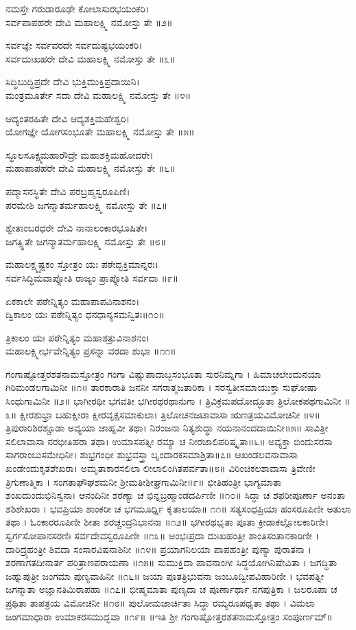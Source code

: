	ನಮಸ್ತೇ ಗರುಡಾರೂಢೇ ಕೋಲಾಸುರಭಯಂಕರಿ।\\
	ಸರ್ವಪಾಪಹರೇ ದೇವಿ ಮಹಾಲಕ್ಷ್ಮಿ ನಮೋಸ್ತು ತೇ ॥೨॥

ಸರ್ವಜ್ಞೇ ಸರ್ವವರದೇ ಸರ್ವದುಷ್ಟಭಯಂಕರಿ।\\
ಸರ್ವದುಃಖಹರೇ ದೇವಿ ಮಹಾಲಕ್ಷ್ಮಿ ನಮೋಸ್ತು ತೇ ॥೩॥

	ಸಿದ್ಧಿಬುದ್ಧಿಪ್ರದೇ ದೇವಿ ಭುಕ್ತಿಮುಕ್ತಿಪ್ರದಾಯಿನಿ।\\
	ಮಂತ್ರಮೂರ್ತೇ ಸದಾ ದೇವಿ ಮಹಾಲಕ್ಷ್ಮಿ ನಮೋಸ್ತು ತೇ ॥೪॥

ಆದ್ಯಂತರಹಿತೇ ದೇವಿ ಆದ್ಯಶಕ್ತಿಮಹೇಶ್ವರಿ।\\
ಯೋಗಜ್ಞೇ ಯೋಗಸಂಭೂತೇ ಮಹಾಲಕ್ಷ್ಮಿ ನಮೋಸ್ತು ತೇ ॥೫॥

	ಸ್ಥೂಲಸೂಕ್ಷ್ಮಮಹಾರೌದ್ರೇ ಮಹಾಶಕ್ತಿಮಹೋದರೇ।\\
	ಮಹಾಪಾಪಹರೇ ದೇವಿ ಮಹಾಲಕ್ಷ್ಮಿ ನಮೋಸ್ತು ತೇ ॥೬॥

ಪದ್ಮಾಸನಸ್ಥಿತೇ ದೇವಿ ಪರಬ್ರಹ್ಮಸ್ವರೂಪಿಣಿ।\\
ಪರಮೇಶಿ ಜಗನ್ಮಾತರ್ಮಹಾಲಕ್ಷ್ಮಿ ನಮೋಸ್ತು ತೇ ॥೭॥

	ಶ್ವೇತಾಂಬರಧರೇ ದೇವಿ ನಾನಾಲಂಕಾರಭೂಷಿತೇ।\\
	ಜಗತ್ಸ್ಥಿತೇ ಜಗನ್ಮಾತರ್ಮಹಾಲಕ್ಷ್ಮಿ ನಮೋಸ್ತು ತೇ ॥೮॥

ಮಹಾಲಕ್ಷ್ಮ್ಯಷ್ಟಕಂ ಸ್ತೋತ್ರಂ ಯಃ ಪಠೇದ್ಭಕ್ತಿಮಾನ್ನರಃ।\\
ಸರ್ವಸಿದ್ಧಿಮವಾಪ್ನೋತಿ ರಾಜ್ಯಂ ಪ್ರಾಪ್ನೋತಿ ಸರ್ವದಾ ॥೯॥

	ಏಕಕಾಲೇ ಪಠೇನ್ನಿತ್ಯಂ ಮಹಾಪಾಪವಿನಾಶನಂ।\\
	ದ್ವಿಕಾಲಂ ಯಃ ಪಠೇನ್ನಿತ್ಯಂ ಧನಧಾನ್ಯಸಮನ್ವಿತಃ॥೧೦॥

ತ್ರಿಕಾಲಂ ಯಃ ಪಠೇನ್ನಿತ್ಯಂ ಮಹಾಶತ್ರುವಿನಾಶನಂ।\\
ಮಹಾಲಕ್ಷ್ಮೀರ್ಭವೇನ್ನಿತ್ಯಂ ಪ್ರಸನ್ನಾ ವರದಾ ಶುಭಾ ॥೧೧॥


ಗಂಗಾಷ್ಟೋತ್ತರಶತನಾಮಸ್ತೋತ್ರಂ
ಗಂಗಾ ವಿಷ್ಣುಪಾದಾಬ್ಜಸಂಭೂತಾ ಸುರನಿಮ್ನಗಾ ।
ಹಿಮಾಚಲೇಂದುನಯಾ ಗಿರಿಮಂಡಲಗಾಮಿನೀ ॥೧॥
	ತಾರಕಾರಾತಿ ಜನನೀ ಸಗರಾತ್ಮಜತಾರಿಕಾ ।
	ಸರಸ್ವತೀಸಮಾಯುಕ್ತಾ ಸುಘೋಷಾ ಸಿಂಧುಗಾಮಿನೀ ॥೨॥
ಭಾಗೀರಥೀ ಭಗವತೀ ಭಗೀರಥರಥಾನುಗಾ ।
ತ್ರಿವಿಕ್ರಮಪದೋದ್ಭೂತಾ ತ್ರಿಲೋಕಪಥಗಾಮಿನೀ ॥೩॥
	ಕ್ಷೀರಶುಭ್ರಾ ಬಹುಕ್ಷೀರಾ ಕ್ಷೀರವೃಕ್ಷಸಮಾಕುಲಾ।
	ತ್ರಿಲೋಚನಜಟಾವಾಸಾ ಋಣತ್ರಯವಿಮೋಚಿನೀ ॥೪॥
ತ್ರಿಪುರಾರಿಶಿರಶ್ಚೂಡಾ ಅವ್ಯಯಾ ಜಾಹ್ನವೀ ತಥಾ।
ನಿರಂಜನಾ ನಿತ್ಯಶುದ್ಧಾ ನಯನಾನಂದದಾಯಿನೀ॥೫॥
	ಸಾವಿತ್ರೀ ಸಲಿಲಾವಾಸಾ ನರಭೀತಿಹರಾ ತಥಾ।
	ಉಮಾಸಪತ್ನೀ ರಮ್ಯಾ ಚ ನೀರಜಾಲಿಪರಿಷ್ಕೃತಾ॥೬॥
ಅವ್ಯಕ್ತಾ ಬಿಂದುಸರಸಾ ಸಾಗರಾಂಬುಸಮೇಧಿನೀ।
ಶುಭ್ರಗಂಧೀ ಶುಭ್ರವಸ್ತ್ರಾ ಬೃಂದಾರಕಸಮಾಶ್ರಿತಾ॥೭॥
	ಆಖಂಡಲವನಾವಾಸಾ ಖಂಡೇಂದುಕೃತಶೇಖರಾ।
	ಅಮೃತಾಕಾರಸಲಿಲಾ ಲೀಲಾಲಿಂಗಿತಪರ್ವತಾ॥೮॥
ವಿರಿಂಚಿಕಲಶಾವಾಸಾ ತ್ರಿವೇಣೀ ತ್ರಿಗುಣಾತ್ಮಿಕಾ ।
ಸಂಗತಾಘೌಘಶಮನೀ ಶ್ರೀಮತೀಶೀಘ್ರಗಾಮಿನೀ॥೯॥
	ಭೀತಿಹಂತ್ರೀ ಭಾಗ್ಯಮಾತಾ ಶಂಖದುಂದುಭಿನಿಸ್ವನಾ।
	ಆನಂದಿನೀ ಶರಣ್ಯಾ ಚ ಭಿನ್ನಬ್ರಹ್ಮಾಂಡದರ್ಪಿಣೀ ॥೧೦॥
ಸಿದ್ಧಾ ಚ ಶಫರೀಪೂರ್ಣಾ ಅನಂತಾ ಶಶಿಶೇಖರಾ ।
ಭವಪ್ರಿಯಾ ಶಾಂಕರೀ ಚ ಭಗಮೂರ್ಧ್ನಿ ಕೃತಾಲಯಾ॥ ೧೧॥
	ಸತ್ಯಸಂಧಪ್ರಿಯಾ ಹಂಸರೂಪಿಣೀ ಅತುಲಾ ತಥಾ ।
	ಓಂಕಾರರೂಪಿಣೀ ಶೀತಾ ಶರಚ್ಚಂದ್ರನಿಭಾನನಾ ॥೧೨॥
ಭಗೀರಥಭೃತಾ ಪೂತಾ ಕ್ರೀಡಾಕಲ್ಲೋಲಕಾರಿಣೀ।
ಸ್ವರ್ಗಸೋಪಾನಸರಣಿಃ ಸರ್ವದೇವಸ್ವರೂಪಿಣೀ ॥೧೩॥
	ಅಂಭಃಪ್ರದಾ ದುಃಖಹಂತ್ರೀ ಶಾಂತಿಸಂತಾನಕಾರಿಣೀ ।
	ದಾರಿದ್ರ್ಯಹಂತ್ರೀ ಶಿವದಾ ಸಂಸಾರವಿಷನಾಶಿನೀ ॥೧೪॥
ಪ್ರಯಾಗನಿಲಯಾ ಪಾಪಹಂತ್ರೀ ಪುಣ್ಯಾ ಪುರಾತನಾ ।
ಶರಣಾಗತದೀನಾರ್ತ ಪರಿತ್ರಾಣಪರಾಯಣಾ ॥೧೫॥
	ಸುಮುಕ್ತಿದಾ ಪಾವನಾಂಗೀ ಸಿದ್ಧಯೋಗಿನಿಷೇವಿತಾ ।
	ಜಗದ್ಧಿತಾ ಜಹ್ನುಪುತ್ರೀ ಜಂಗಮಾ ಪುಣ್ಯವಾಹಿನೀ ॥೧೬॥
ಜಯಾ ಪೂತತ್ರಿಭುವನಾ ಜಂಬೂದ್ವೀಪವಿಹಾರಿಣೀ ।
ಭವಪತ್ನೀ ಜಗನ್ಮಾತಾ ಅಜ್ಞಾನತಿಮಿರಾಪಹಾ ॥೧೭॥
	ಭೀಷ್ಮಮಾತಾ ಪುಣ್ಯದಾ ಚ ಪೂರ್ಣಾರ್ಥಾ ನಗಪುತ್ರಿಕಾ ।
	ಜಲರೂಪಾ ಚ ಪ್ರಥಿತಾ ತಾಪತ್ರಯ ವಿಮೋಚಿನೀ ॥೧೮॥
ಪುಲೋಮಜಾರ್ಚಿತಾ ಸಿದ್ಧಾ ರಮ್ಯರೂಪಧೃತಾ ತಥಾ ।
ವಿಮಲಾ ಜಂಗಮಾಧಾರಾ ಉಮಾಕರಸಮುದ್ಭವಾ ॥೧೯॥
॥ಇತಿ ಶ್ರೀ ಗಂಗಾಷ್ಟೋತ್ತರಶತನಾಮಸ್ತೋತ್ರಂ ಸಂಪೂರ್ಣಮ್॥


